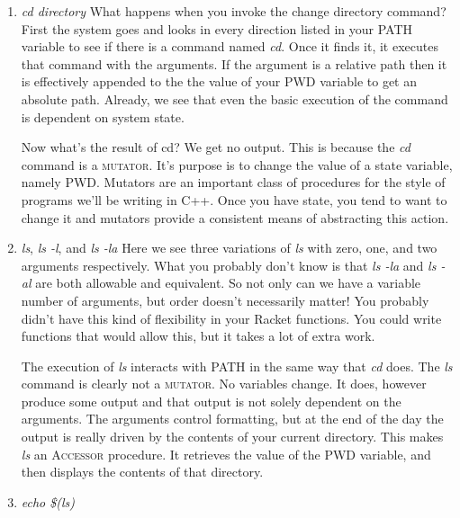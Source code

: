 \documentclass[]{tufte-handout}
\begin{document}
\begin{enumerate}
\item \textit{cd \textit{directory}} \newline
What happens when you invoke the change directory command? First the system goes and looks in every direction listed in your PATH variable to see if there is a command named \textit{cd}. Once it finds it, it executes that command with the arguments.  If the argument is a relative path then it is effectively appended to the the value of your PWD variable to get an absolute path. Already, we see that even the basic execution of the command is dependent on system state.

Now what's the result of cd? We get no output. This is because the \textit{cd} command is a \textsc{mutator}. It's purpose is to change the value of a state variable, namely PWD. Mutators are an important class of procedures for the style of programs we'll be writing in C++. Once you have state, you tend to want to change it and mutators provide a consistent means of abstracting this action. 


\item \textit{ls}, \textit{ls -l}, and \textit{ls -la} \newline
Here we see three variations of \textit{ls} with zero, one, and two arguments respectively.  What you probably don't know is that \textit{ls -la} and \textit{ls -al}  are both allowable and equivalent. So not only can we have a variable number of arguments, but order doesn't necessarily matter! You probably didn't have this kind of flexibility in your Racket functions.  You could write functions that would allow this, but it takes a lot of extra work. 

The execution of \textit{ls} interacts with PATH in the same way that \textit{cd} does. The \textit{ls} command is clearly not a \textsc{mutator}. No variables change. It does, however produce some output and that output is not solely dependent on the arguments.  The arguments control formatting, but at the end of the day the output is really driven by the contents of your current directory. This makes \textit{ls} an \textsc{Accessor} procedure. It retrieves the value of the PWD variable, and then displays the contents of that directory. 

\item \textit{echo \$(ls)} \newline


\end{enumerate}
\end{document}
